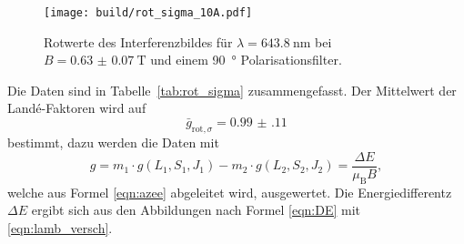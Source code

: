\begin{figure}[htb]
  \centering
  \texttt{[image: build/rot\_sigma\_10A.pdf]}
  \caption{Rotwerte des Interferenzbildes für $\lambda=\SI{643.8}{\nano\meter}$ bei $B=\SI{0.63(7)}{\tesla}$ und einem \SI{90}{\degree} Polarisationsfilter.}
  \label{fig:rot_sigma_10A_plot}
\end{figure}
Die Daten sind in Tabelle~\ref{tab:rot_sigma} zusammengefasst.
Der Mittelwert der Landé-Faktoren wird auf
\begin{equation}
  \label{eqn:g_rot_sigma}
  \bar{g}_{\text{rot},\sigma}=\num{0.99(11)}
\end{equation}
bestimmt, dazu werden die Daten mit  
\begin{equation}
  \label{eqn:g}
  g=m_1 \cdot g(L_1, S_1, J_1) - m_2 \cdot g(L_2, S_2, J_2)=\frac{\Delta E}{\mu_\text{B}B},
\end{equation}
welche aus Formel \eqref{eqn:azee} abgeleitet wird, ausgewertet. Die Energiedifferentz $\Delta E$ ergibt sich aus den 
Abbildungen nach Formel \eqref{eqn:DE} mit \eqref{eqn:lamb_versch}.

\FloatBarrier

